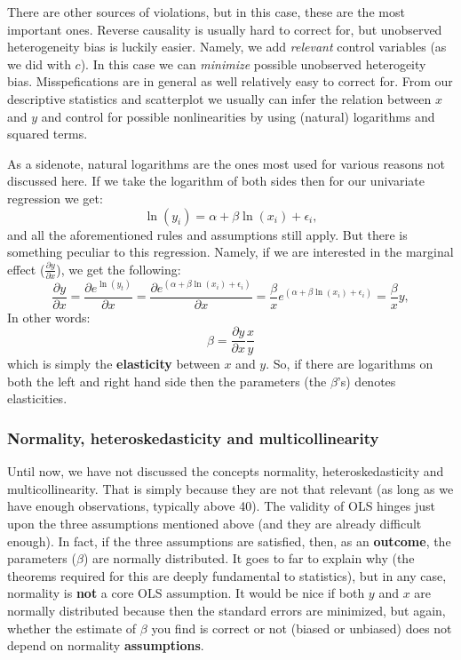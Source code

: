 \documentclass[]{article}
\theoremstyle{definition}
\theoremstyle{definition}
\theoremstyle{definition}
\theoremstyle{remark}
\begin{document}
There are other sources of violations, but in this case, these are the
most important ones. Reverse causality is usually hard to correct for,
but unobserved heterogeneity bias is luckily easier. Namely, we add
\emph{relevant} control variables (as we did with \(c\)). In this case
we can \emph{minimize} possible unobserved heterogeity bias.
Misspefications are in general as well relatively easy to correct for.
From our descriptive statistics and scatterplot we usually can infer the
relation between \(x\) and \(y\) and control for possible nonlinearities
by using (natural) logarithms and squared terms.

As a sidenote, natural logarithms are the ones most used for various
reasons not discussed here. If we take the logarithm of both sides then
for our univariate regression we get: \[
\ln(y_i) = \alpha + \beta \ln(x_i) + \epsilon_i,
\] and all the aforementioned rules and assumptions still apply. But
there is something peculiar to this regression. Namely, if we are
interested in the marginal effect (\(\frac{\partial y}{\partial x}\)),
we get the following: \[
\frac{\partial y}{\partial x} = \frac{\partial e^{\ln(y_t)}}{\partial x} = \frac{\partial e^{(\alpha + \beta \ln(x_i) + \epsilon_i)}}{\partial x} = \frac{\beta}{x}e^{(\alpha + \beta \ln(x_i) + \epsilon_i)} = \frac{\beta}{x}y, 
\] In other words: \[
\beta = \frac{\partial y}{\partial x} \frac{x}{y}
\] which is simply the \textbf{elasticity} between \(x\) and \(y\). So,
if there are logarithms on both the left and right hand side then the
parameters (the \(\beta\)'s) denotes elasticities.

\subsubsection{Normality, heteroskedasticity and
multicollinearity}\label{normality-heteroskedasticity-and-multicollinearity}

Until now, we have not discussed the concepts normality,
heteroskedasticity and multicollinearity. That is simply because they
are not that relevant (as long as we have enough observations, typically
above 40). The validity of OLS hinges just upon the three assumptions
mentioned above (and they are already difficult enough). In fact, if the
three assumptions are satisfied, then, as an \textbf{outcome}, the
parameters (\(\beta\)) are normally distributed. It goes to far to
explain why (the theorems required for this are deeply fundamental to
statistics), but in any case, normality is \textbf{not} a core OLS
assumption. It would be nice if both \(y\) and \(x\) are normally
distributed because then the standard errors are minimized, but again,
whether the estimate of \(\beta\) you find is correct or not (biased or
unbiased) does not depend on normality \textbf{assumptions}.
\end{document}
